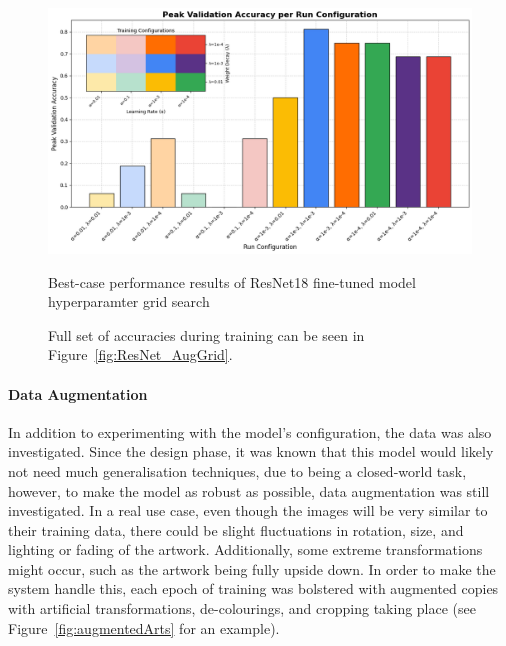                         \begin{figure}[h]
                            \centering
                            \includegraphics[width=\textwidth]{images/ResNetCNN_AugGridHist.png}
                            \caption{Best-case performance results of ResNet18 fine-tuned model hyperparamter grid search}
                            \caption*{
                                Full set of accuracies during training can be seen in Figure~\ref{fig:ResNet_AugGrid}.
                            }
                            \label{fig:ResNet_AugGridHist}
                        \end{figure}
        
                    \paragraph{Data Augmentation}
        
                        In addition to experimenting with the model's configuration, the data was also investigated. Since the design phase, it was known that this model would likely not need much generalisation techniques, due to being a closed-world task, however, to make the model as robust as possible, data augmentation was still investigated. In a real use case, even though the images will be very similar to their training data, there could be slight fluctuations in rotation, size, and lighting or fading of the artwork. Additionally, some extreme transformations might occur, such as the artwork being fully upside down. In order to make the system handle this, each epoch of training was bolstered with augmented copies with artificial transformations, de-colourings, and cropping taking place (see Figure~\ref{fig:augmentedArts} for an example).
    
